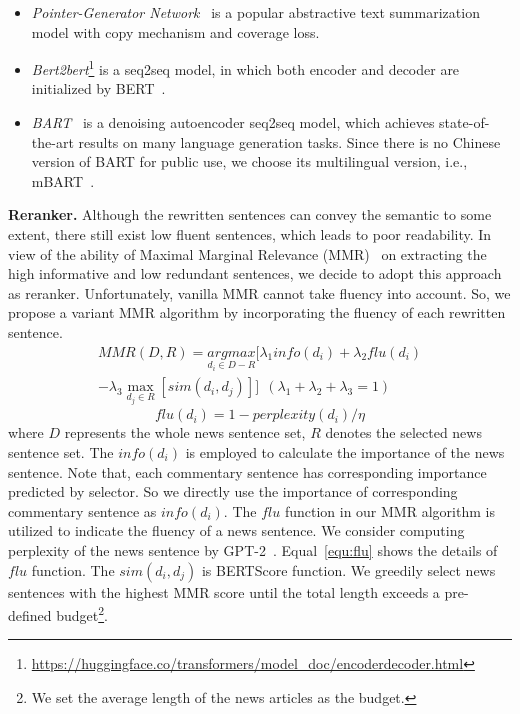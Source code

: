 \begin{itemize}[leftmargin=*,topsep=0pt]
\item \emph{Pointer-Generator Network}~\cite{See2017GetTT} is a popular abstractive text summarization model with copy mechanism and coverage loss.
\item \emph{Bert2bert}\footnote{\url{https://huggingface.co/transformers/model_doc/encoderdecoder.html}} is a seq2seq model, in which both encoder and decoder are initialized by BERT~\cite{Devlin2019BERTPO}.
\item \emph{BART}~\cite{Lewis2020BARTDS} is a denoising autoencoder seq2seq model, which achieves state-of-the-art results on many language generation tasks. Since there is no Chinese version of BART for public use, we choose its multilingual version, i.e., mBART~\cite{Liu2020MultilingualDP}.
\end{itemize}

\vspace{1ex}
\noindent\textbf{Reranker.} Although the rewritten sentences can convey the semantic to some extent, there still exist low fluent sentences, which leads to poor readability.
In view of the ability of Maximal Marginal Relevance (MMR)~\cite{carbonell1998use} on extracting the high informative and low redundant sentences, we decide to adopt this approach as reranker. Unfortunately, vanilla MMR cannot take fluency into account. So, we propose a variant MMR algorithm by incorporating the fluency of each rewritten sentence. 
\begin{equation}
\begin{split}
MMR(D, R)={\underset {d_{i}\in D-R}{argmax}}[\lambda_{1}info(d_{i})+\lambda_{2}flu(d_{i})\\
-\lambda_{3}\max_{d_{j}\in R} [sim(d_{i},d_{j})]]\ \  (\lambda_{1} + \lambda_{2} + \lambda_{3} = 1)
\end{split}
\end{equation}
\begin{equation}
  \label{equ:flu}
    flu(d_{i}) = 1 - perplexity(d_{i})/\eta
\end{equation}
where $D$ represents the whole news sentence set, $R$ denotes the selected news sentence set.
The $info(d_{i})$ is employed to calculate the importance of the news sentence. Note that, each commentary sentence has corresponding importance predicted by selector. So we directly use the importance of corresponding commentary sentence as $info(d_{i})$.
The $flu$ function in our MMR algorithm is utilized to indicate the fluency of a news sentence. We consider computing perplexity of the news sentence by GPT-2~\cite{Radford2019LanguageMA}. Equal~\ref{equ:flu} shows the details of $flu$ function.
The $sim(d_{i},d_{j})$ is BERTScore function.
We greedily select news sentences with the highest MMR score until the total length exceeds a pre-defined budget\footnote{We set the average length of the news articles as the budget.}. 

